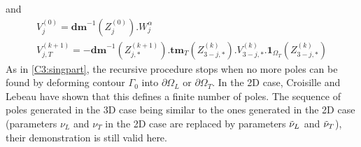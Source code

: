 and
\begin{equation}
\begin{matrix}
V_{j}^{(0)}=\textbf{dm}^{-1}(Z_{j}^{(0)}).W_j^{\alpha}\\
V_{j,T}^{(k+1)}=-\textbf{dm}^{-1}(Z_{j,*}^{(k+1)}).\textbf{tm}_T(Z_{3-j,*}^{(k)}).V_{3-j,*}^{(k)}.\textbf{1}_{\Omega_T}(Z_{3-j,*}^{(k)}) 
\end{matrix}
\label{C4:residuscr}
\end{equation}
As in \ref{C3:singpart}, the recursive procedure stops when no more poles can be found by deforming contour $\Gamma_0$ into $\partial \Omega_L$ or $\partial \Omega_T$. In the 2D case, Croisille and Lebeau \cite{CroisilleLebeau} have shown that this defines a finite number of poles. The sequence of poles generated in the 3D case being similar to the ones generated in the 2D case (parameters $\nu_L$ and $\nu_T$ in the 2D case are replaced by parameters $\tilde{\nu}_L$ and $\tilde{\nu}_T$), their demonstration is still valid here. 
